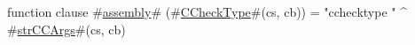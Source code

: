 function clause #\hyperref[sailMIPSzassembly]{assembly}# (#\hyperref[sailMIPSzCCheckType]{CCheckType}#(cs, cb)) = "cchecktype " ^ #\hyperref[sailMIPSzstrCCArgs]{strCCArgs}#(cs, cb)

